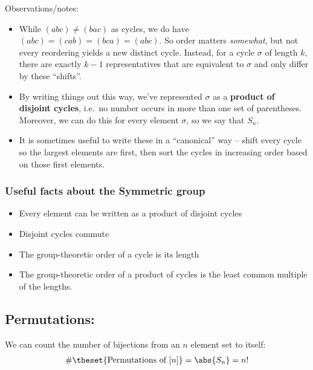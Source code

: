 Observations/notes:

\begin{itemize}
\tightlist
\item
  While \((abc) \neq (bac)\) as cycles, we do have
  \((abc) = (cab) = (bca) = (abc)\). So order matters \emph{somewhat},
  but not every reordering yields a new distinct cycle. Instead, for a
  cycle \(\sigma\) of length \(k\), there are exactly \(k-1\)
  representatives that are equivalent to \(\sigma\) and only differ by
  these ``shifts''.
\item
  By writing things out this way, we've represented \(\sigma\) as a
  \textbf{product of disjoint cycles}, i.e.~no number occurs in more
  than one set of parentheses. Moreover, we can do this for every
  element \(\sigma\), so we say that \(S_n\).
\item
  It is sometimes useful to write these in a ``canonical'' way -- shift
  every cycle so the largest elements are first, then sort the cycles in
  increasing order based on those first elements.
\end{itemize}

\hypertarget{useful-facts-about-the-symmetric-group}{%
\subsubsection{Useful facts about the Symmetric
group}\label{useful-facts-about-the-symmetric-group}}

\begin{itemize}
\tightlist
\item
  Every element can be written as a product of disjoint cycles
\item
  Disjoint cycles commute
\item
  The group-theoretic order of a cycle is its length
\item
  The group-theoretic order of a product of cycles is the least common
  multiple of the lengths.
\end{itemize}

\hypertarget{permutations}{%
\subsection{Permutations:}\label{permutations}}

We can count the number of bijections from an \(n\) element set to
itself:
\begin{align*} \#\theset{\text{Permutations of } [n]} = \abs{S_n}  = n! \end{align*}

